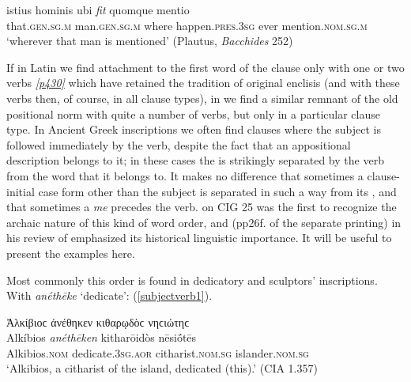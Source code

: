 \begin{exe}
\ex
\gll istius hominis ubi \emph{fit} quomque mentio\\
that.\textsc{gen.sg.m} man.\textsc{gen.sg.m} where happen.\textsc{pres.3sg} ever mention.\textsc{nom.sg.m}\\
\trans `wherever that man is mentioned' (Plautus, \textit{Bacchides} 252)
\label{encliticest6}
\end{exe}

If in Latin we find attachment to the first word of the clause only with one or two verbs \hyperlink{p430}{\emph{[p430]}} which have retained the tradition of original enclisis (and with these verbs then, of course, in all clause types), in  we find a similar remnant of the old positional norm with quite a number of verbs, but only in a particular clause type. In Ancient Greek inscriptions we often find clauses where the subject is followed immediately by the verb, despite the fact that an appositional description belongs to it; in these cases the  is strikingly separated by the verb from the word that it belongs to. It makes no difference that sometimes a clause-initial case form other than the subject  is separated in such a way from its , and that sometimes a \emph{me} precedes the verb. \citet[41--42]{Boeckh1828} on CIG 25 was the first to recognize the archaic nature of this kind of word order, and \citet[1472]{Schulze1890} (pp26f. of the separate printing) in his review of \citet{Meister1889} emphasized its historical linguistic importance. It will be useful to present the examples here.

Most commonly this order is found in dedicatory and sculptors' inscriptions. With \emph{anéthēke} `dedicate': (\ref{subjectverb1}).

\begin{exe}
\ex Ἀλκίβιοϲ ἀνέθηκεν κιθαρῳδὸϲ νηϲιώτηϲ\\
\gll Alkíbios \emph{anéthēken} kitharōidòs nēsiṓtēs\\
Alkibios.\textsc{nom} dedicate.\textsc{3sg.aor} citharist.\textsc{nom.sg} islander.\textsc{nom.sg}\\
\trans `Alkibios, a citharist of the island, dedicated (this).' (CIA 1.357) 
\label{subjectverb1}
\end{exe}

